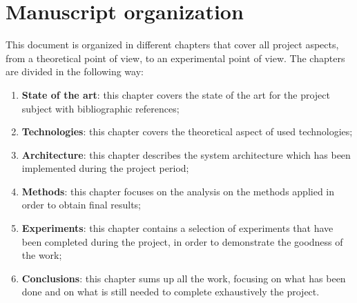 \documentclass[\main/main.tex]{subfiles}
\begin{document}
\section*{Manuscript organization}
This document is organized in different chapters that cover all project aspects, from a theoretical point of view, to an experimental point of view.
The chapters are divided in the following way:
\begin{enumerate}
    \item \textbf{State of the art}: this chapter covers the state of the art for the project subject with bibliographic references;
    \item \textbf{Technologies}: this chapter covers the theoretical aspect of used technologies;
    \item \textbf{Architecture}: this chapter describes the system architecture which has been implemented during the project period;
    \item \textbf{Methods}: this chapter focuses on the analysis on the methods applied in order to obtain final results;
    \item \textbf{Experiments}: this chapter contains a selection of experiments that have been completed during the project, in order to demonstrate the goodness of the work;
    \item \textbf{Conclusions}: this chapter sums up all the work, focusing on what has been done and on what is still needed to complete exhaustively the project.
\end{enumerate}
\end{document}
